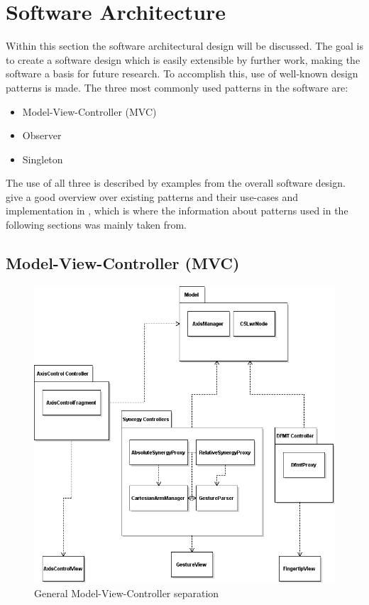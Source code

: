 \section{Software Architecture}

Within this section the software architectural design will be discussed. The goal is to create a software design which is easily extensible by further work, making the software a basis for future research. To accomplish this, use of well-known design patterns is made. The three most commonly used patterns in the software are:
\begin{itemize}
	\item Model-View-Controller (MVC)
	\item Observer
	\item Singleton
\end{itemize}

The use of all three is described by examples from the overall software design. \citeauthor{Eilebrecht2013} give a good overview over existing patterns and their use-cases and implementation in \cite{Eilebrecht2013}, which is where the information about patterns used in the following sections was mainly taken from.

\subsection{Model-View-Controller (MVC)}

\begin{figure}
	\caption{\label{fig:conc:mvc}General Model-View-Controller separation}
	\includegraphics[width=\linewidth]{assets/chpt_concepts/sw/mvc.png}
\end{figure}

